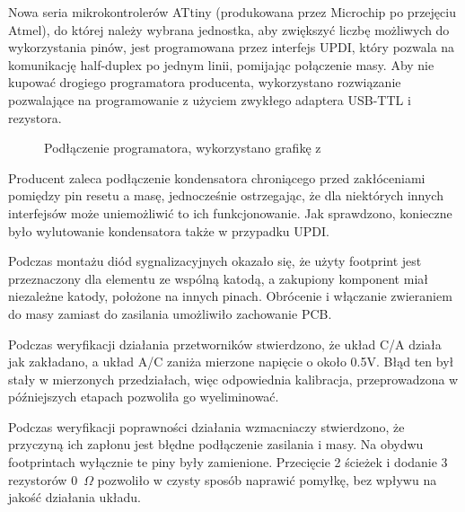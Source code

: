 \documentclass[polish,engineer]{polsl-msth}
\begin{document}
Nowa seria mikrokontrolerów ATtiny (produkowana przez Microchip po przejęciu Atmel), do której należy wybrana jednostka, aby zwiększyć liczbę możliwych do wykorzystania pinów, jest programowana przez interfejs UPDI, który pozwala na komunikację half-duplex po jednym linii, pomijając połączenie masy. Aby nie kupować drogiego programatora producenta, wykorzystano rozwiązanie pozwalające na programowanie z użyciem zwykłego adaptera USB-TTL i rezystora\cite{pyupdi}.
\begin{figure}[hbtp]
\centering
     \caption{Podłączenie programatora, wykorzystano grafikę z \cite{pyupdi}\label{img:pyupdi}}
\end{figure}
Producent zaleca podłączenie kondensatora chroniącego przed zakłóceniami pomiędzy pin resetu a masę, jednocześnie ostrzegając, że dla niektórych innych interfejsów może uniemożliwić to ich funkcjonowanie\cite{avr_hardware}. Jak sprawdzono, konieczne było wylutowanie kondensatora także w przypadku UPDI.

Podczas montażu diód sygnalizacyjnych okazało się, że użyty footprint jest przeznaczony dla elementu ze wspólną katodą, a zakupiony komponent miał niezależne katody, położone na innych pinach. Obrócenie i włączanie zwieraniem do masy zamiast do zasilania umożliwiło zachowanie PCB.

Podczas weryfikacji działania przetworników stwierdzono, że układ C/A działa jak zakładano, a układ A/C zaniża mierzone napięcie o około 0.5V. Błąd ten był stały w mierzonych przedziałach, więc odpowiednia kalibracja, przeprowadzona w późniejszych etapach pozwoliła go wyeliminować.

Podczas weryfikacji poprawności działania wzmacniaczy stwierdzono, że przyczyną ich zapłonu jest błędne podłączenie zasilania i masy. Na obydwu footprintach wyłącznie te piny były zamienione. Przecięcie 2 ścieżek i dodanie 3 rezystorów 0~$\Omega$ pozwoliło w czysty sposób naprawić pomyłkę, bez wpływu na jakość działania układu.
\end{document}
